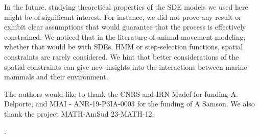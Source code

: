 \documentclass[aoas]{imsart}
\theoremstyle{definition}
\theoremstyle{remark}
\theoremstyle{remark}
\newcommand {\1}{\mathbb{1}}
\begin{document}
In the future, studying theoretical properties of the SDE models we used here might be of significant interest. For instance, we did not prove any result or exhibit clear assumptions that would guarantee that the process is effectively constrained. We noticed that in the literature of animal movement modeling, whether that would be with SDEs, HMM or step-selection functions, spatial constraints are rarely considered. We hint that better considerations of the spatial constraints can give new insights into the interactions between marine mammals and their environment.




\begin{funding}
The authors would like to thank the CNRS and IRN Madef for funding A. Delporte, and MIAI - ANR-19-P3IA-0003 for the funding of A Samson.
We also thank the project MATH-AmSud 23-MATH-12.
\end{funding}

\begin{supplement}
.
\end{supplement}


\end{document}
